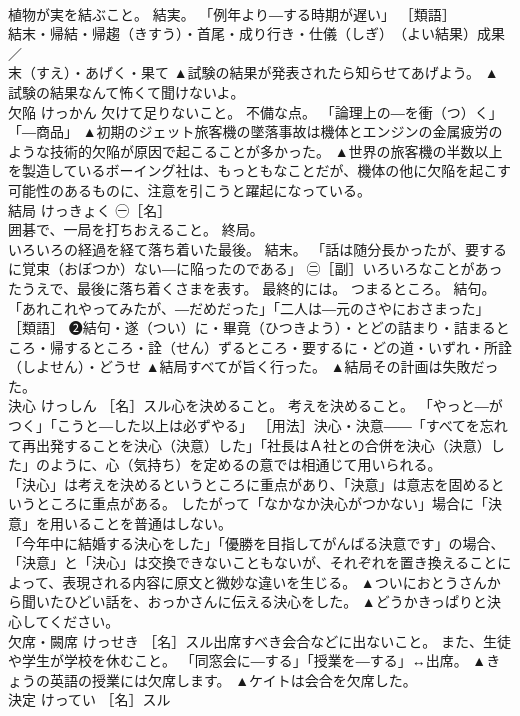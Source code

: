 \documentclass[8pt]{extreport}
\begin{document}
\begin{CJK}{UTF8}{min}
\\	植物が実を結ぶこと。 結実。 「例年より―する時期が遅い」 ［類語］
\\	結末・帰結・帰趨（きすう）・首尾・成り行き・仕儀（しぎ）　（よい結果）成果／
\\	末（すえ）・あげく・果て	▲試験の結果が発表されたら知らせてあげよう。 ▲試験の結果なんて怖くて聞けないよ。
\\	欠陥	けっかん	欠けて足りないこと。 不備な点。 「論理上の―を衝（つ）く」「―商品」	▲初期のジェット旅客機の墜落事故は機体とエンジンの金属疲労のような技術的欠陥が原因で起こることが多かった。 ▲世界の旅客機の半数以上を製造しているボーイング社は、もっともなことだが、機体の他に欠陥を起こす可能性のあるものに、注意を引こうと躍起になっている。
\\	結局	けっきょく	㊀［名］ 
\\	囲碁で、一局を打ちおえること。 終局。 
\\	いろいろの経過を経て落ち着いた最後。 結末。 「話は随分長かったが、要するに覚束（おぼつか）ない―に陥ったのである」 ㊁［副］いろいろなことがあったうえで、最後に落ち着くさまを表す。 最終的には。 つまるところ。 結句。 「あれこれやってみたが、―だめだった」「二人は―元のさやにおさまった」 ［類語］ ❷結句・遂（つい）に・畢竟（ひつきよう）・とどの詰まり・詰まるところ・帰するところ・詮（せん）ずるところ・要するに・どの道・いずれ・所詮（しよせん）・どうせ	▲結局すべてが旨く行った。 ▲結局その計画は失敗だった。
\\	決心	けっしん	［名］スル心を決めること。 考えを決めること。 「やっと―がつく」「こうと―した以上は必ずやる」 ［用法］決心・決意――「すべてを忘れて再出発することを決心（決意）した」「社長はＡ社との合併を決心（決意）した」のように、心（気持ち）を定めるの意では相通じて用いられる。 
\\	「決心」は考えを決めるというところに重点があり、「決意」は意志を固めるというところに重点がある。 したがって「なかなか決心がつかない」場合に「決意」を用いることを普通はしない。 
\\	「今年中に結婚する決心をした」「優勝を目指してがんばる決意です」の場合、「決意」と「決心」は交換できないこともないが、それぞれを置き換えることによって、表現される内容に原文と微妙な違いを生じる。	▲ついにおとうさんから聞いたひどい話を、おっかさんに伝える決心をした。 ▲どうかきっぱりと決心してください。
\\	欠席・闕席	けっせき	［名］スル出席すべき会合などに出ないこと。 また、生徒や学生が学校を休むこと。 「同窓会に―する」「授業を―する」↔出席。	▲きょうの英語の授業には欠席します。 ▲ケイトは会合を欠席した。
\\	決定	けってい	［名］スル 

\end{CJK}
\end{document}

